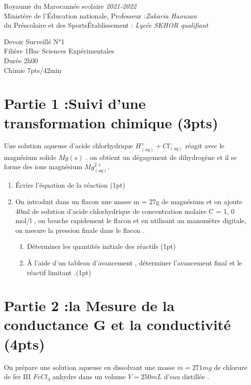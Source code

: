 \documentclass[12pt]{article}
\newcommand\headerMe[2]{\noindent{}#1\hfill#2}
\begin{document}
\headerMe{Royaume du Maroc}{année scolaire \emph{2021-2022}}\\
\headerMe{Ministère de l'Éducation nationale, }{  Professeur :\emph{Zakaria Haouzan}}\\
\headerMe{du Préscolaire et des Sports}{Établissement : \emph{Lycée SKHOR qualifiant}}\\

\begin{center}
Devoir Surveillé  N°1 \\
    Filière 1Bac Sciences Expérimentales\\
Durée 2h00
\\
    \vspace{.2cm}
\hrulefill
\Large{Chimie 7pts/42min}
\hrulefill\\

\end{center}

 \section*{Partie 1 :Suivi d’une transformation chimique \dotfill(3pts) }
   Une solution aqueuse d’acide chlorhydrique $H^+_{(aq)} + Cl^{-}_{(aq)}$ réagit avec le magnésium solide $Mg(s)$ . on obtient un dégagement de dihydrogène et il se forme des ions magnésium $Mg^{2+}_{(aq)}$.
   \begin{enumerate}
   \item  Écrire l’équation de la réaction \dotfill(1pt)
   \item On introduit dans un flacon une masse m = 27g de magnésium et on ajoute 40ml de solution d’acide chlorhydrique de concentration molaire C = 1, 0 mol/l , on bouche rapidement le flacon et en utilisant un manomètre digitale, on mesure la pression finale dans le flacon .
      \begin{enumerate}
        \item Déterminer les quantités initiale des réactifs \dotfill(1pt)
        \item À l’aide d’un tableau d’avancement , déterminer l’avancement final et le réactif limitant .\dotfill(1pt)
      \end{enumerate}
   \end{enumerate}

 \section*{Partie 2 :la Mesure de la conductance G et la conductivité \dotfill(4pts) }
On prépare une solution aqueuse en dissolvant une masse $m=271mg$ de chlorure de fer III $FeCl_3$ anhydre dans un volume $V=250mL$ d’eau distillée .
\end{document}
